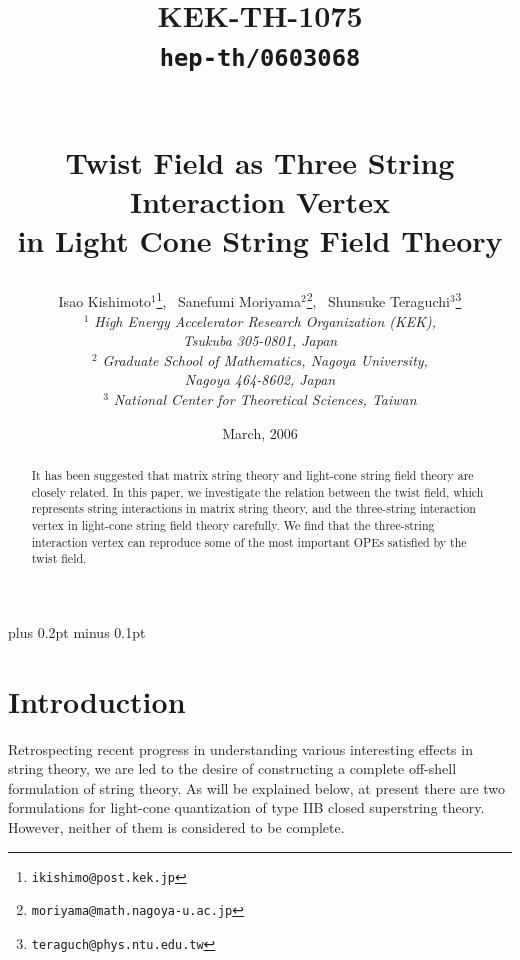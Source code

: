 \documentclass[12pt]{article}
\begin{document}
\baselineskip=15pt plus 0.2pt minus 0.1pt

\begin{titlepage}
\title{
\hfill\parbox{4cm}
{\normalsize KEK-TH-1075\\
{\tt hep-th/0603068}}\\
\vspace{1cm}
{\bf Twist Field as Three String Interaction Vertex\\
in Light Cone String Field Theory}
}
\author{
Isao {\sc Kishimoto}${}^{1}${}\thanks
{{\tt ikishimo@post.kek.jp}},~ 
Sanefumi {\sc Moriyama}${}^{2}${}\thanks
{{\tt moriyama@math.nagoya-u.ac.jp}},~
Shunsuke {\sc Teraguchi}${}^{3}${}\thanks
{{\tt teraguch@phys.ntu.edu.tw}}
\\[12pt]
{${}^{1}$
\it High Energy Accelerator Research Organization (KEK),}\\
{\it Tsukuba 305-0801, Japan}\\[6pt]
{${}^{2}$
\it Graduate School of Mathematics, Nagoya University,}\\
{\it Nagoya 464-8602, Japan}\\[6pt]
{${}^{3}$
\it National Center for Theoretical Sciences, Taiwan}\\
}
\date{\normalsize March, 2006}
\maketitle
\thispagestyle{empty}

\begin{abstract}
\normalsize
It has been suggested that matrix string theory and light-cone string
field theory are closely related.
In this paper, we investigate the relation between the twist field,
which represents string interactions in matrix string theory, and the
three-string interaction vertex in light-cone string field theory
carefully.
We find that the three-string interaction vertex can reproduce some of
the most important OPEs satisfied by the twist field.
\end{abstract}

\end{titlepage}

\section{Introduction}
Retrospecting recent progress in understanding various interesting
effects in string theory, we are led to the desire of constructing a
complete off-shell formulation of string theory.
As will be explained below, at present there are two formulations for
light-cone quantization of type IIB closed superstring theory.
However, neither of them is considered to be complete.
\end{document}
